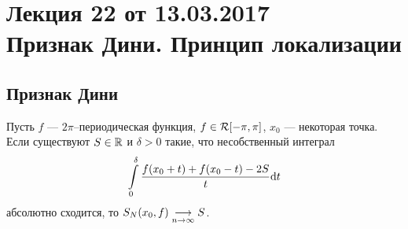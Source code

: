 \pagestyle{fancy}
\section{Лекция 22 от 13.03.2017 \\  Признак Дини. Принцип локализации}
\subsection{Признак Дини}
\begin{Theorem}
Пусть $f$ --- $2\pi$--периодическая функция, $f \in \mathcal{R}[-\pi, \pi]$, $x_0$ --- некоторая точка. Если существуют $S \in \mathbb{R}$ и $\delta > 0$ такие, что несобственный интеграл
$$
\int\limits_{0}^{\delta}\dfrac{f(x_0 + t) + f(x_0 - t) - 2S}{t}\mathrm{d} t 
$$
абсолютно сходится, то $S_N(x_0, f) \underset{n\to \infty}{\longrightarrow} S$.
\end{Theorem}
